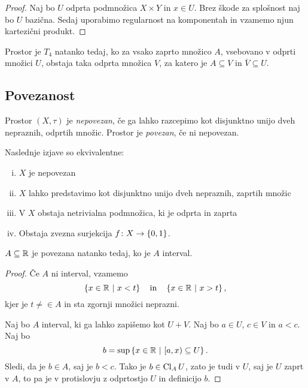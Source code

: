 \begin{proof}
Naj bo $U$ odprta podmnožica $X \times Y$ in $x \in U$. Brez škode
za splošnost naj bo $U$ bazična. Sedaj uporabimo regularnost na
komponentah in vzamemo njun kartezični produkt.
\end{proof}

\begin{trditev}
Prostor je $T_4$ natanko tedaj, ko za vsako zaprto množico $A$,
vsebovano v odprti množici $U$, obstaja taka odprta množica $V$,
za katero je $A \subseteq V$ in $\overline{V} \subseteq U$.
\end{trditev}

\obvs

\newpage

\subsection{Povezanost}


\begin{okvir}
\begin{definicija}
Prostor $(X, \tau)$ je \emph{nepovezan}, če ga lahko razcepimo kot
disjunktno unijo dveh nepraznih, odprtih množic. Prostor je
\emph{povezan}, če ni
nepovezan.
\end{definicija}
\end{okvir}

\begin{trditev}
Naslednje izjave so ekvivalentne:

\begin{enumerate}[i)]
\item $X$ je nepovezan
\item $X$ lahko predstavimo kot disjunktno unijo dveh nepraznih,
zaprtih množic
\item V $X$ obstaja netrivialna podmnožica, ki je odprta in zaprta
\item Obstaja zvezna surjekcija $f \colon X \to \left\{0,1\right\}$.
\end{enumerate}
\end{trditev}

\obvs

\begin{izrek}
$A \subseteq \mathbb{R}$ je povezana natanko tedaj, ko je $A$ interval.
\end{izrek}

\begin{proof}
Če $A$ ni interval, vzamemo
\[
\left\{x \in \mathbb{R}~\middle\vert~x<t\right\} \quad \text{in} \quad \left\{x \in \mathbb{R}~\middle\vert~x>t\right\},
\]
kjer je $t \ne \in A$ in sta zgornji množici neprazni.

Naj bo $A$ interval, ki ga lahko zapišemo kot $U+V$. Naj bo
$a \in U$, $c \in V$ in $a < c$. Naj bo
\[
b = \sup \left\{x \in \mathbb{R}~\middle\vert~[a,x) \subseteq U\right\}.
\]
Sledi, da je $b \in A$, saj je $b < c$. Tako je $b \in \operatorname{Cl}_A U$,
zato je tudi v $U$, saj je $U$ zaprt v $A$, to pa je v protislovju
z odprtostjo $U$ in definicijo $b$.
\end{proof}

